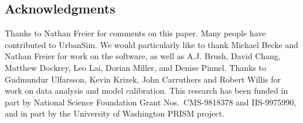 
\subsection*{Acknowledgments}

Thanks to Nathan Freier for comments on this paper.  Many people have
contributed to UrbanSim.  We would particularly like to thank Michael Becke
and Nathan Freier for work on the software, as well as A.J. Brush, David
Chang, Matthew Dockrey, Leo Lai, Dorian Miller, and Denise Pinnel.  Thanks
to Gudmundur Ulfarsson, Kevin Krizek, John Carruthers and Robert Willis for
work on data analysis and model calibration.  This research has been funded
in part by National Science Foundation Grant Nos.~CMS-9818378
and IIS-9975990, and in part
by the University of Washington PRISM project.

